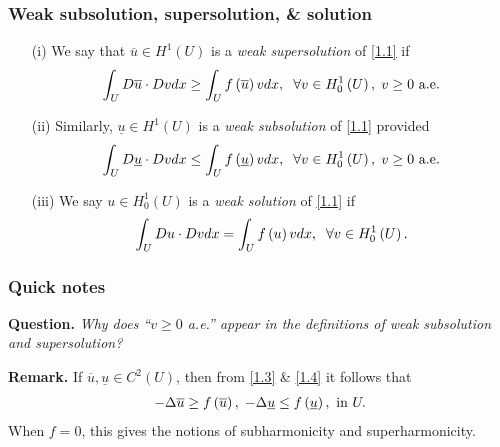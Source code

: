 \documentclass{beamer}
\begin{document}
\begin{frame}
\frametitle{Weak subsolution, supersolution, \& solution}
\begin{definition}
\begin{itemize}
\item[(i)] We say that $\overline{u} \in H^1\left(U\right)$ is a \emph{weak supersolution} of \eqref{1.1} if 
\begin{align}
\label{1.3}
\int_U {D\overline u  \cdot Dvdx}  \ge \int_U {f\left( {\overline u } \right)vdx} ,\hspace{2mm}\forall v \in H_0^1\left( U \right),\hspace{1mm}v \ge 0 \mbox{ a.e.}
\end{align}
\item[(ii)] Similarly, $\underline{u} \in H^1\left(U\right)$ is a \emph{weak subsolution} of \eqref{1.1} provided
\begin{align}
\label{1.4}
\int_U {D\underline u  \cdot Dvdx}  \le \int_U {f\left( {\underline u } \right)vdx} ,\hspace{2mm}\forall v \in H_0^1\left( U \right),\hspace{1mm} v \ge 0 \mbox{ a.e.}
\end{align}
\item[(iii)] We say $u\in H_0^1\left(U\right)$ is a \emph{weak solution} of \eqref{1.1} if
\begin{align}
\int_U {Du \cdot Dvdx}  = \int_U {f\left( u \right)vdx} ,\hspace{2mm} \forall v \in H_0^1\left( U \right).
\end{align}
\end{itemize}
\end{definition}

\end{frame}

\begin{frame}
\frametitle{Quick notes}
\textbf{Question.} \textit{Why does ``$v\ge 0$ a.e.'' appear in the definitions of weak subsolution and supersolution?}
\medskip

\noindent
\textbf{Remark.} If $\overline{u}, \underline{u} \in C^2\left(U\right)$, then from \eqref{1.3} \& \eqref{1.4} it follows that
\begin{align}
\label{1.6}
 - \Delta \overline u  \ge f\left( {\overline u } \right),\hspace{1mm} - \Delta \underline u  \le f\left( {\underline u } \right), \mbox{ in } U.
\end{align}
When $f=0$, this gives the notions of subharmonicity and superharmonicity.
\end{frame}
\end{document}
